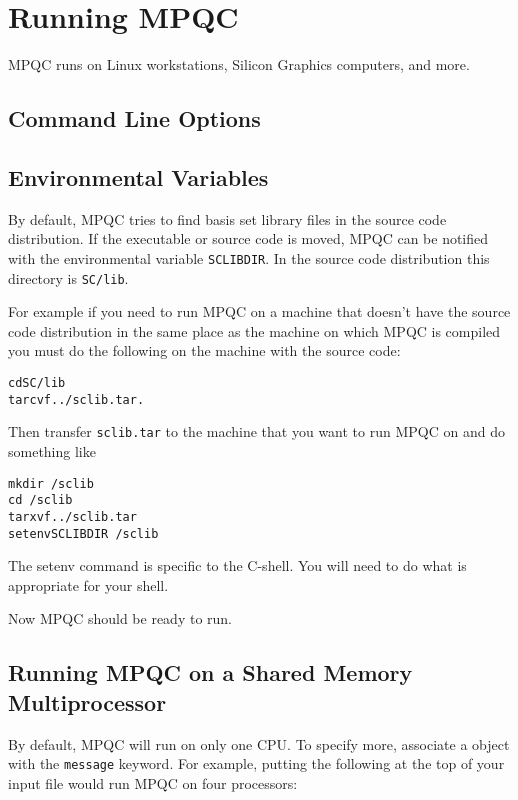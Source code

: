 
\chapter{Running MPQC}

MPQC runs on Linux workstations, Silicon Graphics computers,
and more.

\section{Command Line Options}

\section{Environmental Variables}

By default, MPQC tries to find basis set library files in
the source code distribution.  If the executable or source
code is moved, MPQC can be notified with the environmental
variable \verb|SCLIBDIR|.  In the source code distribution
this directory is \verb|SC/lib|.

For example if you need to run MPQC on a machine that doesn't
have the source code distribution in the same place as the
machine on which MPQC is compiled you must do the following
on the machine with the source code:

\begin{alltt}
cd SC/lib
tar cvf ../sclib.tar .
\end{alltt}

Then transfer \verb|sclib.tar| to the machine that you want to run
MPQC on and do something like

\begin{alltt}
mkdir ~/sclib
cd ~/sclib
tar xvf ../sclib.tar
setenv SCLIBDIR ~/sclib
\end{alltt}

The setenv command is specific to the C-shell.  You will need to
do what is appropriate for your shell.

Now MPQC should be ready to run.

\section{Running MPQC on a Shared Memory Multiprocessor}

By default, MPQC will run on only one CPU.  To specify more, associate
a  object with the \verb|message|
keyword.  For example, putting the following at the top of your input file
would run MPQC on four processors:

